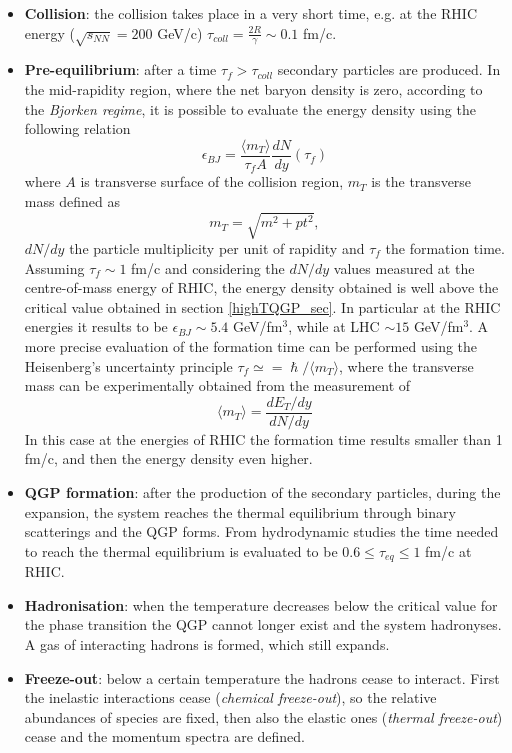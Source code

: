 \documentclass[b5paper,10pt,twoside,oldstyle,classica]{toptesi}
\begin{document}
\begin{itemize}
 \item \textbf{Collision}: the collision takes place in a very short time, e.g. at the RHIC energy ($\sqrt{s_{NN}}=200$ GeV/c) $\tau_{coll} = \frac{2R}{\gamma} \sim 0.1$ fm/c.
 \item \textbf{Pre-equilibrium}: after a time $\tau_f > \tau_{coll}$ secondary particles are produced. In the mid-rapidity region, where the net baryon density is zero, according to the \textit{Bjorken regime}, it is possible to evaluate the energy density using the following relation
 \begin{equation}
 \label{bjorken_e}
 \epsilon_{BJ} = \frac{\langle m_T \rangle}{\tau_f A} \frac{dN}{dy}(\tau_f)
 \end{equation}
 where $A$ is transverse surface of the collision region, $m_T$ is the transverse mass defined as 
 \begin{equation}
  m_T = \sqrt{m^2+pt^2},
 \end{equation}
$dN/dy$ the particle multiplicity per unit of rapidity and $\tau_f$ the formation time. Assuming $\tau_f \sim 1$ fm/c and considering the $dN/dy$ values measured at the centre-of-mass energy of RHIC, the energy density obtained is well above the critical value obtained in section \ref{highTQGP_sec}. In particular at the RHIC energies it results to be $\epsilon_{BJ} \sim 5.4$ GeV/fm$^3$, while at LHC $\sim 15$ GeV/fm$^3$.
A more precise evaluation of the formation time can be performed using the Heisenberg's uncertainty principle $\tau_f \simeq = \hslash/\langle m_T \rangle$, where the transverse mass can be experimentally obtained from the measurement of 
 \begin{equation}
  \langle m_T \rangle = \frac{dE_T/dy}{dN/dy}
  \end{equation}
 In this case at the energies of RHIC the formation time results smaller than 1 fm/c, and then the energy density even higher. 
 \item \textbf{QGP formation}: after the production of the secondary particles, during the expansion, the system reaches the thermal equilibrium through binary scatterings and the QGP forms. From hydrodynamic studies the time needed to reach the thermal equilibrium is evaluated to be $0.6 \leq \tau_{eq} \leq 1$ fm/c at RHIC.     
 \item \textbf{Hadronisation}: when the temperature decreases below the critical value for the phase transition the QGP cannot longer exist and the system hadronyses. A gas of interacting hadrons is formed, which still expands.
 \item \textbf{Freeze-out}: below a certain temperature the hadrons cease to interact. First the inelastic interactions cease (\textit{chemical freeze-out}), so the relative abundances of species are fixed, then also the elastic ones (\textit{thermal freeze-out}) cease and the momentum spectra are defined.
\end{itemize}
\end{document}
